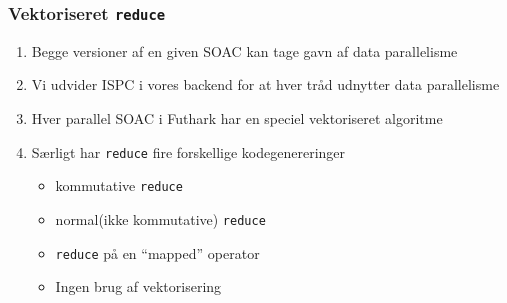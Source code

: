 \documentclass{beamer}
\begin{document}
\begin{frame}
  \frametitle{Vektoriseret \texttt{reduce}}
  \begin{enumerate}
  \item Begge versioner af en given SOAC kan tage gavn af data parallelisme
  \item Vi udvider ISPC i vores backend for at hver tråd udnytter data parallelisme
  \item Hver parallel SOAC i Futhark har en speciel vektoriseret algoritme
  \item Særligt har \texttt{reduce} fire forskellige kodegenereringer
    \begin{itemize}
    \item kommutative \texttt{reduce}
    \item normal(ikke kommutative) \texttt{reduce}
    \item \texttt{reduce} på en ``mapped'' operator
    \item Ingen brug af vektorisering
    \end{itemize}
  \end{enumerate}
\end{frame}
\end{document}
